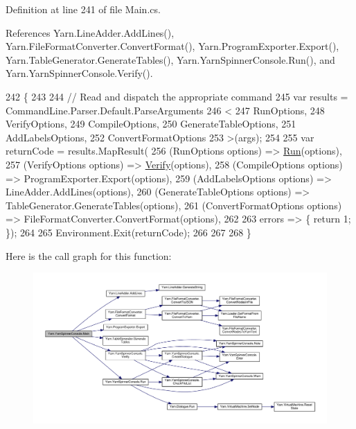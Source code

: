 Definition at line 241 of file Main.\-cs.



References Yarn.\-Line\-Adder.\-Add\-Lines(), Yarn.\-File\-Format\-Converter.\-Convert\-Format(), Yarn.\-Program\-Exporter.\-Export(), Yarn.\-Table\-Generator.\-Generate\-Tables(), Yarn.\-Yarn\-Spinner\-Console.\-Run(), and Yarn.\-Yarn\-Spinner\-Console.\-Verify().


\begin{DoxyCode}
242         \{
243 
244             \textcolor{comment}{// Read and dispatch the appropriate command}
245             var results = CommandLine.Parser.Default.ParseArguments
246             <
247             RunOptions,
248             VerifyOptions,
249             CompileOptions,
250             GenerateTableOptions,
251             AddLabelsOptions,
252             ConvertFormatOptions
253             >(args);
254 
255             var returnCode = results.MapResult(
256                 (RunOptions options) => \hyperlink{a00185_a1b974c55540795a9e643c2ec055fbd51}{Run}(options),
257                 (VerifyOptions options) => \hyperlink{a00185_a029a5624e7cc3a16ae586b64f13049de}{Verify}(options),
258                 (CompileOptions options) => ProgramExporter.Export(options),
259                 (AddLabelsOptions options) => LineAdder.AddLines(options),
260                 (GenerateTableOptions options) => TableGenerator.GenerateTables(options),
261                 (ConvertFormatOptions options) => FileFormatConverter.ConvertFormat(options),
262 
263                 errors => \{ \textcolor{keywordflow}{return} 1; \});
264 
265             Environment.Exit(returnCode);
266 
267 
268         \}
\end{DoxyCode}


Here is the call graph for this function\-:
\nopagebreak
\begin{figure}[H]
\begin{center}
\leavevmode
\includegraphics[width=350pt]{a00185_a1d71ff2eb190449ea1d42ce86f44489f_cgraph}
\end{center}
\end{figure}


